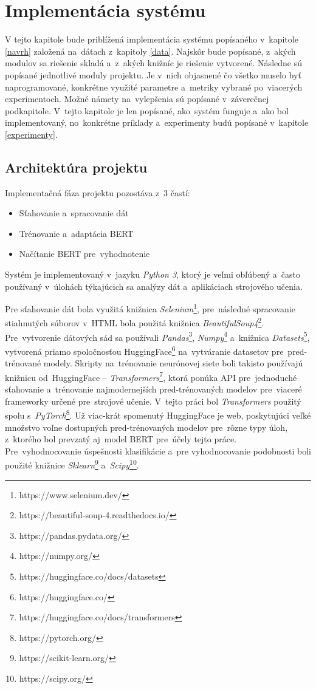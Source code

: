 \chapter{Implementácia systému}
\label{implementacia}
V tejto kapitole bude priblížená implementácia systému popísaného v~kapitole \ref{navrh} založená na~dátach z~kapitoly \ref{data}. Najskôr bude popísané, z~akých modulov sa riešenie skladá a~z~akých knižníc je riešenie vytvorené. Následne sú popísané jednotlivé moduly projektu. Je v~nich objasnené čo všetko muselo byť naprogramované, konkrétne využité parametre a~metriky vybrané po~viacerých experimentoch. Možné námety na~vylepšenia sú popísané v~záverečnej podkapitole. V~tejto kapitole je len popísané, ako~systém funguje a~ako bol implementovaný, no~konkrétne príklady a~experimenty budú popísané v~kapitole \ref{experimenty}.

\section{Architektúra projektu}

Implementačná fáza projektu pozostáva z~3 častí: 
\begin{itemize}
    \item Sťahovanie a~spracovanie dát
    \item Trénovanie a~adaptácia BERT
    \item Načítanie BERT pre~vyhodnotenie
\end{itemize} 

Systém je implementovaný v~jazyku \textit{Python 3}, ktorý je veľmi obľúbený a~často používaný v~úlohách týkajúcich sa analýzy dát a~aplikáciach strojového učenia. 

Pre sťahovanie dát bola využitá knižnica \textit{Selenium}\footnote{https://www.selenium.dev/}, pre~následné spracovanie stiahnutých súborov v~HTML bola použitá knižnica  \textit{BeautifulSoup4}\footnote{https://beautiful-soup-4.readthedocs.io/}. Pre~vytvorenie dátových sád sa používali \textit{Pandas}\footnote{https://pandas.pydata.org/}, \textit{Numpy}\footnote{https://numpy.org/} a~knižnica \textit{Datasets}\footnote{https://huggingface.co/docs/datasets}, vytvorená priamo spoločnosťou HuggingFace\footnote{https://huggingface.co/} na~vytváranie datasetov pre~pred-trénované modely. Skripty na~trénovanie neurónovej siete boli takisto používajú knižnicu od~HuggingFace -- \textit{Transformers}\footnote{https://huggingface.co/docs/transformers}, ktorá ponúka API pre~jednoduché sťahovanie a~trénovanie najmodernejších pred-trénovaných modelov pre~viaceré frameworky určené pre~strojové učenie. V~tejto práci bol \textit{Transformers} použitý spolu s~\textit{PyTorch}\footnote{https://pytorch.org/}. Už viac-krát spomenutý HuggingFace je web, poskytujúci veľké množstvo voľne dostupných pred-trénovaných modelov pre~rôzne typy úloh, z~ktorého bol prevzatý aj~model BERT pre~účely tejto práce. Pre~vyhodnocovanie úspešnosti klasifikácie a~pre vyhodnocovanie podobnosti boli použité knižnice \textit{Sklearn}\footnote{https://scikit-learn.org/} a~\textit{Scipy}\footnote{https://scipy.org/}.
 
